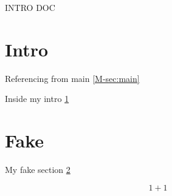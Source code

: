 \documentclass[manuscript.tex]{subfiles}
\begin{document}
INTRO DOC

\section{Intro}
\label{sec:intro}
Referencing from main \ref{M-sec:main}

Inside my intro \ref{sec:intro}

\section{Fake}
\label{M-sec:fake} %
My fake section \ref{M-sec:fake}

\begin{equation}
  \label{eq:intro:1}
  1+1
\end{equation}
\end{document}
